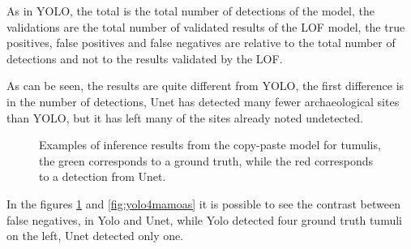 As in YOLO, the total is the total number of detections of the model, the validations are the total number of validated results of the LOF model, the true positives, false positives and false negatives are relative to the total number of detections and not to the results validated by the LOF.

As can be seen, the results are quite different from YOLO, the first difference is in the number of detections, Unet has detected many fewer archaeological sites than YOLO, but it has left many of the sites already noted undetected.

\begin{figure}[H]
    \centering
    \qquad
    \caption{Examples of inference results from the copy-paste model for tumulis, the green corresponds to a ground truth, while the red corresponds to a detection from Unet.}%
    \label{fig:unet4mamoas}
\end{figure}

In the figures \ref{fig:unet4mamoas} and  \ref{fig:yolo4mamoas} it is possible to see the contrast between false negatives, in Yolo and Unet, while Yolo detected four ground truth tumuli on the left, Unet detected only one.

